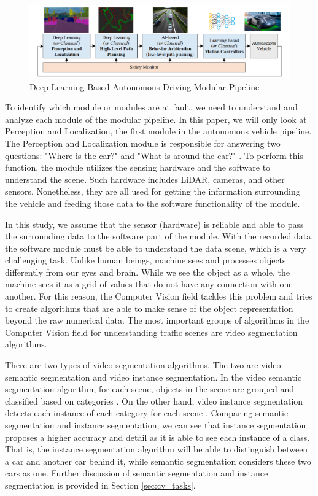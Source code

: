 \begin{figure}[!ht] \centering
    \includegraphics[keepaspectratio=true,width=6in]{figures/autonomous_driving_modular_pipeline.png}
    \caption{Deep Learning Based Autonomous Driving Modular Pipeline \cite{grigorescu_trasnea_cocias_macesanu_2020}}
    \label{fig:autonomous_driving_pipeline}
\end{figure}

To identify which module or modules are at fault, we need to understand and analyze each module of the modular pipeline. In this paper, we will only look at Perception and Localization, the first module in the autonomous vehicle pipeline. The Perception and Localization module is responsible for answering two questions: "Where is the car?" and "What is around the car?" \cite{liu_2020}. To perform this function, the module utilizes the sensing hardware and the software to understand the scene. Such hardware includes LiDAR, cameras, and other sensors. Nonetheless, they are all used for getting the information surrounding the vehicle and feeding those data to the software functionality of the module.

In this study, we assume that the sensor (hardware) is reliable and able to pass the surrounding data to the software part of the module. With the recorded data, the software module must be able to understand the data scene, which is a very challenging task. Unlike human beings, machine sees and processes objects differently from our eyes and brain. While we see the object as a whole, the machine sees it as a grid of values that do not have any connection with one another. For this reason, the Computer Vision field tackles this problem and tries to create algorithms that are able to make sense of the object representation beyond the raw numerical data. The most important groups of algorithms in the Computer Vision field for understanding traffic scenes are video segmentation algorithms.

There are two types of video segmentation algorithms. The two are video semantic segmentation and video instance segmentation. In the video semantic segmentation algorithm, for each scene, objects in the scene are grouped and classified based on categories \cite{overview_cv_task}. On the other hand, video instance segmentation detects each instance of each category for each scene \cite{overview_cv_task}. Comparing semantic segmentation and instance segmentation, we can see that instance segmentation proposes a higher accuracy and detail as it is able to see each instance of a class. That is, the instance segmentation algorithm will be able to distinguish between a car and another car behind it, while semantic segmentation considers these two cars as one. Further discussion of semantic segmentation and instance segmentation is provided in Section \ref{sec:cv_tasks}.

